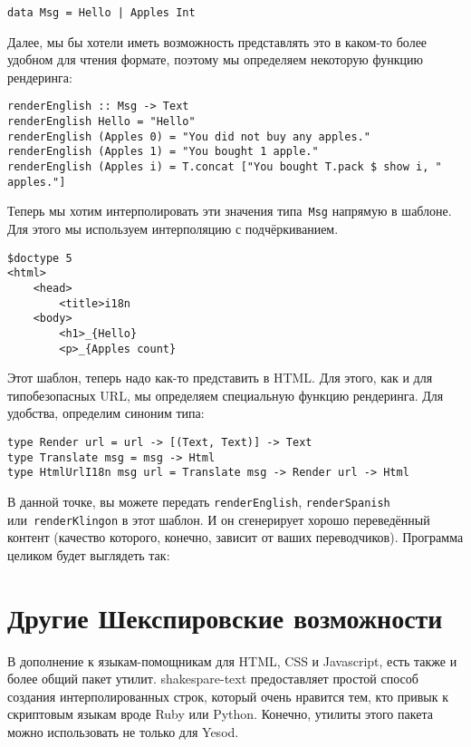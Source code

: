 \begin{lstlisting}
data Msg = Hello | Apples Int
\end{lstlisting}

Далее, мы бы хотели иметь возможность представлять это в каком-то более удобном
для чтения формате, поэтому мы определяем некоторую функцию рендеринга:
\begin{lstlisting}
renderEnglish :: Msg -> Text
renderEnglish Hello = "Hello"
renderEnglish (Apples 0) = "You did not buy any apples."
renderEnglish (Apples 1) = "You bought 1 apple."
renderEnglish (Apples i) = T.concat ["You bought T.pack $ show i, " apples."]
\end{lstlisting}

Теперь мы хотим интерполировать эти значения типа~\lstinline'Msg' напрямую в
шаблоне.  Для этого мы используем интерполяцию с подчёркиванием.

\begin{lstlisting}
$doctype 5
<html>
    <head>
        <title>i18n
    <body>
        <h1>_{Hello}
        <p>_{Apples count}
\end{lstlisting}

Этот шаблон, теперь надо как-то представить в HTML.  Для этого, как и
для типобезопасных URL, мы определяем специальную функцию рендеринга.
Для удобства, определим синоним типа:

\begin{lstlisting}
type Render url = url -> [(Text, Text)] -> Text
type Translate msg = msg -> Html
type HtmlUrlI18n msg url = Translate msg -> Render url -> Html
\end{lstlisting}

В данной точке, вы можете передать \lstinline'renderEnglish',
\lstinline'renderSpanish' или~\lstinline'renderKlingon' в этот шаблон. И он
сгенерирует хорошо переведённый контент (качество которого, конечно, зависит от
ваших переводчиков). Программа целиком будет выглядеть так:

\section{Другие Шекспировские возможности}
В дополнение к языкам-помощникам для HTML, CSS и Javascript, есть также и более
общий пакет утилит. shakespare-text предоставляет простой способ
создания интерполированных строк, который очень нравится тем, кто привык к
скриптовым языкам вроде Ruby или Python. Конечно, утилиты этого пакета можно
использовать не только для Yesod.

